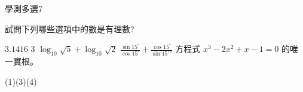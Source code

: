     \begin{QUESTION}
        \begin{ExamInfo}{98}{學測}{多選}{7}
        \end{ExamInfo}
        \begin{ExamAnsRateInfo}{39}{67}{35}{15}
        \end{ExamAnsRateInfo}
        \begin{QBODY}
            試問下列哪些選項中的數是有理數? 
			\begin{QOPS} 
				\QOP $3.1416$
				\QOP $3$ 
				\QOP $\log_{10} \sqrt{5}+ \log_{10}\sqrt{2}$ 
				\QOP $\frac{\sin{15^\circ}}{\cos{15^\circ}} +  \frac{\cos{15^\circ}}{\sin{15^\circ°}}$ \quad 
				\QOP 方程式 $x^3 - 2x^2 +x-1=0$ 的唯一實根。
			\end{QOPS}
        \end{QBODY}
        \begin{QFROMS}
        \end{QFROMS}
        \begin{QTAGS}\end{QTAGS}
        \begin{QANS}
            (1)(3)(4)
        \end{QANS}
        \begin{QSOLLIST}
        \end{QSOLLIST}
        \begin{QEMPTYSPACE}
        \end{QEMPTYSPACE}
    \end{QUESTION}
